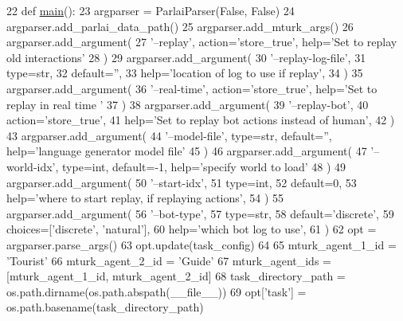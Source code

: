 \begin{DoxyCode}
22 \textcolor{keyword}{def }\hyperlink{namespaceprojects_1_1wizard__of__wikipedia_1_1mturk__evaluation__task_1_1run_ad3ab2c71f8083c3112815c0b363d316b}{main}():
23     argparser = ParlaiParser(\textcolor{keyword}{False}, \textcolor{keyword}{False})
24     argparser.add\_parlai\_data\_path()
25     argparser.add\_mturk\_args()
26     argparser.add\_argument(
27         \textcolor{stringliteral}{'--replay'}, action=\textcolor{stringliteral}{'store\_true'}, help=\textcolor{stringliteral}{'Set to replay old interactions'}
28     )
29     argparser.add\_argument(
30         \textcolor{stringliteral}{'--replay-log-file'},
31         type=str,
32         default=\textcolor{stringliteral}{''},
33         help=\textcolor{stringliteral}{'location of log to use if replay'},
34     )
35     argparser.add\_argument(
36         \textcolor{stringliteral}{'--real-time'}, action=\textcolor{stringliteral}{'store\_true'}, help=\textcolor{stringliteral}{'Set to replay in real time '}
37     )
38     argparser.add\_argument(
39         \textcolor{stringliteral}{'--replay-bot'},
40         action=\textcolor{stringliteral}{'store\_true'},
41         help=\textcolor{stringliteral}{'Set to replay bot actions instead of human'},
42     )
43     argparser.add\_argument(
44         \textcolor{stringliteral}{'--model-file'}, type=str, default=\textcolor{stringliteral}{''}, help=\textcolor{stringliteral}{'language generator model file'}
45     )
46     argparser.add\_argument(
47         \textcolor{stringliteral}{'--world-idx'}, type=int, default=-1, help=\textcolor{stringliteral}{'specify world to load'}
48     )
49     argparser.add\_argument(
50         \textcolor{stringliteral}{'--start-idx'},
51         type=int,
52         default=0,
53         help=\textcolor{stringliteral}{'where to start replay, if replaying actions'},
54     )
55     argparser.add\_argument(
56         \textcolor{stringliteral}{'--bot-type'},
57         type=str,
58         default=\textcolor{stringliteral}{'discrete'},
59         choices=[\textcolor{stringliteral}{'discrete'}, \textcolor{stringliteral}{'natural'}],
60         help=\textcolor{stringliteral}{'which bot log to use'},
61     )
62     opt = argparser.parse\_args()
63     opt.update(task\_config)
64 
65     mturk\_agent\_1\_id = \textcolor{stringliteral}{'Tourist'}
66     mturk\_agent\_2\_id = \textcolor{stringliteral}{'Guide'}
67     mturk\_agent\_ids = [mturk\_agent\_1\_id, mturk\_agent\_2\_id]
68     task\_directory\_path = os.path.dirname(os.path.abspath(\_\_file\_\_))
69     opt[\textcolor{stringliteral}{'task'}] = os.path.basename(task\_directory\_path)

\end{DoxyCode}
